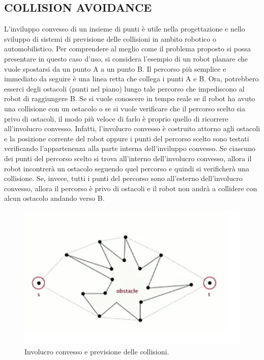 \documentclass[12pt,a4paper]{report}
\begin{document}
\subsection*{\small{COLLISION AVOIDANCE}}
L'inviluppo convesso di un insieme di punti è utile nella progettazione e nello sviluppo di sistemi di previsione delle collisioni in ambito robotico o automobilistico. Per comprendere al meglio come il problema proposto si possa presentare in questo caso d'uso, si considera l'esempio di un robot planare che vuole spostarsi da un punto A a un punto B. Il percorso più semplice e immediato da seguire è una linea retta che collega i punti A e B. Ora, potrebbero esserci degli ostacoli (punti nel piano) lungo tale percorso che impediscono al robot di raggiungere B. Se si vuole conoscere in tempo reale se il robot ha avuto una collisione con un ostacolo o se si vuole verificare che il percorso scelto sia privo di ostacoli, il modo più veloce di farlo è proprio quello di ricorrere all'involucro convesso. Infatti, l'involucro convesso è costruito attorno agli ostacoli e la posizione corrente del robot oppure i punti del percorso scelto sono testati verificando l'appartenenza alla parte interna dell'inviluppo convesso. Se ciascuno dei punti del percorso scelto si trova all'interno dell'involucro convesso, allora il robot incontrerà un ostacolo seguendo quel percorso e quindi si verificherà una collisione. Se, invece, tutti i punti del percorso sono all'esterno dell'involucro convesso, allora il percorso è privo di ostacoli e il robot non andrà a collidere con alcun ostacolo andando verso B.

\begin{figure}[ht]
    \centering
    \includegraphics[width=0.75\linewidth]{collisionAvoidance.png}
    \caption{Involucro convesso e previsione delle collisioni.}
\end{figure}

\pagebreak
\end{document}
